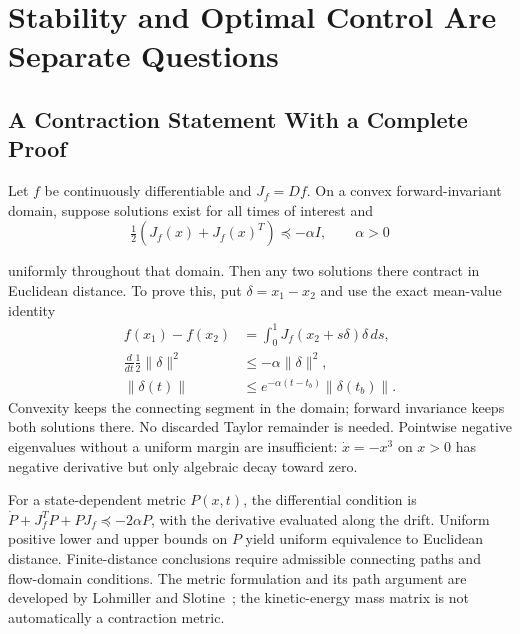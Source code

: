 \section{Stability and Optimal Control Are Separate Questions}
\label{sec:ch7:stability}
\label{prop:ch7:minimal-intervention}
\label{prop:ch7:ZTCF-stability}

\subsection{A Contraction Statement With a Complete Proof}
\label{def:ch7:drift-jacobian}
Let $f$ be continuously differentiable and $J_f=D f$. On a convex forward-invariant domain, suppose solutions exist for all times of interest and
\begin{equation}
\tfrac12(J_f(x)+J_f(x)^T)\preceq-\alpha I,\qquad \alpha>0
\label{eq:ch7:drift-jacobian}
\end{equation}

uniformly throughout that domain. Then any two solutions there contract in Euclidean distance. To prove this, put $\delta=x_1-x_2$ and use the exact mean-value identity
\begin{equation}
\begin{aligned}
f(x_1)-f(x_2)&=\int_0^1J_f(x_2+s\delta)\delta\,ds,\\
\frac{d}{dt}\tfrac12\|\delta\|^2&\leq-\alpha\|\delta\|^2,\\
\|\delta(t)\|&\leq e^{-\alpha(t-t_b)}\|\delta(t_b)\|.
\end{aligned}
\label{eq:ch7:exponential-contraction}
\end{equation}
\label{thm:ch7:drift-contraction}
\label{thm:ch7:drift-contraction-proof}
Convexity keeps the connecting segment in the domain; forward invariance keeps both solutions there. No discarded Taylor remainder is needed. Pointwise negative eigenvalues without a uniform margin are insufficient: $\dot x=-x^3$ on $x>0$ has negative derivative but only algebraic decay toward zero.

For a state-dependent metric $P(x,t)$, the differential condition is $\dot P+J_f^TP+PJ_f\preceq-2\alpha P$, with the derivative evaluated along the drift. Uniform positive lower and upper bounds on $P$ yield uniform equivalence to Euclidean distance. Finite-distance conclusions require admissible connecting paths and flow-domain conditions. The metric formulation and its path argument are developed by Lohmiller and Slotine~\cite{LohmillerSlotine1998}; the kinetic-energy mass matrix is not automatically a contraction metric.

